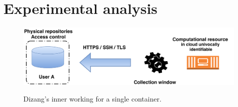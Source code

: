 \documentclass[10pt,journal,compsoc]{IEEEtran}
\newcommand{\marcos}[1]{{\color{green}{MARCOS: #1}}}
\newcommand{\fancyname}{Dizang}
\begin{document}
\section{Experimental analysis}
\label{sec:proposal-impl}

\begin{figure}[htb!]
\footnotesize
\caption{\fancyname's inner working for a single container. 
}
\includegraphics[center,scale=0.45]{solucao-eng-small.pdf}
\centering
\label{fig:Solucao}
\end{figure}
\end{document}
